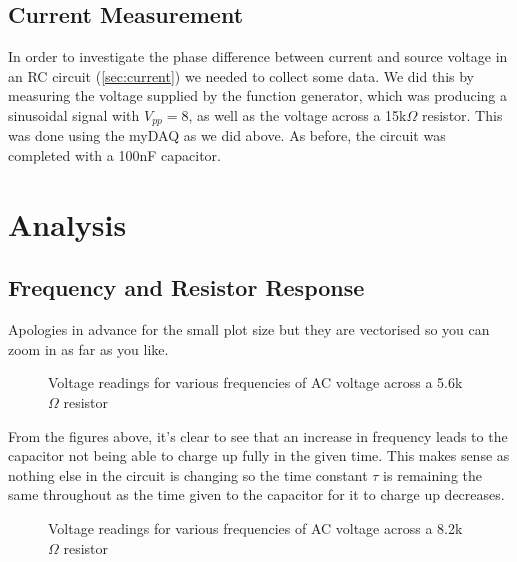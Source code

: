 \documentclass[12pt]{article}
\numberwithin{equation}{section}
\numberwithin{figure}{section}
\begin{document}
    \subsection{Current Measurement}\label{sec:currentMeasurement}
    In order to investigate the phase difference between current and source voltage in an RC circuit 
    (\autoref{sec:current}) we needed to collect some data. We did this by measuring the voltage supplied 
    by the function generator, which was producing a sinusoidal signal with $V_{pp}=8$, as well as the 
    voltage across a 15k$\Omega$ resistor. This was done using the myDAQ as we did above. As before, the 
    circuit was completed with a 100nF capacitor. 

    \section{Analysis}
    \subsection{Frequency and Resistor Response}\label{sec:FreqResistorResponse}
    Apologies in advance for the small plot size but they are vectorised so you can zoom in as far as you like. 
    \begin{figure}[H]%
        \centering
        \qquad
        \qquad
        \qquad
        \caption{Voltage readings for various frequencies of AC voltage across a 5.6k$\Omega$ resistor}
        \label{fig:5.6kResistor}
    \end{figure}
    
    From the figures above, it's clear to see that an increase in frequency leads to the capacitor not being 
    able to charge up fully in the given time. This makes sense as nothing else in the circuit is changing 
    so the time constant $\tau$ is remaining the same throughout as the time given to the capacitor for it 
    to charge up decreases.
    
    \begin{figure}[H]%
        \centering
        \qquad
        \qquad
        \qquad
        \caption{Voltage readings for various frequencies of AC voltage across a 8.2k$\Omega$ resistor}
        \label{fig:8.2kResistor}
    \end{figure}
\end{document}
